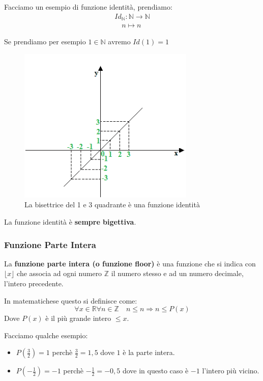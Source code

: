 \documentclass{article}
\begin{document}
Facciamo un esempio di funzione identità, prendiamo:
\begin{align*}
        Id_{\mathbb{N}} : \mathbb{N} \to \mathbb{N} \\
        \quad n \mapsto n
\end{align*}

Se prendiamo per esempio $ 1 \in \mathbb{N} $ avremo $ Id(1) = 1 $ \par
\begin{figure}[h]
        \centering
                \includegraphics[width=0.75\textwidth]{es_funz_identita.png}
        \caption{La bisettrice del 1 e 3 quadrante è una funzione identità}\label{fig:esempio_funzione_identità}
\end{figure}
La funzione identità è \textbf{sempre bigettiva}.


\subsubsection{Funzione Parte Intera}\label{sec:funzione_parte_intera}
La \textbf{funzione parte intera (o funzione floor)} è una funzione che si indica con $ \lfloor x \rfloor $ che associa ad ogni numero $ \mathbb{Z} $  il numero stesso e ad un numero decimale, l'intero precedente. \par
In matematichese questo si definisce come:
\begin{equation*}
        \forall x \in \mathbb{R} \forall n \in \mathbb{Z} \quad n \le n \Rightarrow n \le P(x)
\end{equation*}
Dove $ P(x) $ è il più grande intero $ \le  x$. \par
Facciamo qualche esempio: 
\begin{itemize}
        \item $ P(\frac{3}{2}) = 1$ perchè $ \frac{3}{2} = 1,5 $ dove $ 1 $ è la parte intera.   
        \item $ P( - \frac{1}{2}) = -1$ perchè $ - \frac{1}{2} = -0,5 $ dove in questo caso è $ -1 $ l'intero più vicino. 
\end{itemize} 
\end{document}
